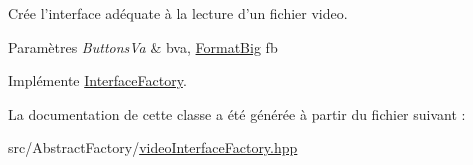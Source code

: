 Crée l'interface adéquate à la lecture d'un fichier video. 


\begin{DoxyParams}{Paramètres}
{\em Buttons\+Va} & bva, \hyperlink{classFormatBig}{Format\+Big} fb \\
\hline
\end{DoxyParams}


Implémente \hyperlink{classInterfaceFactory}{Interface\+Factory}.



La documentation de cette classe a été générée à partir du fichier suivant \+:\begin{DoxyCompactItemize}
\item 
src/\+Abstract\+Factory/\hyperlink{videoInterfaceFactory_8hpp}{video\+Interface\+Factory.\+hpp}\end{DoxyCompactItemize}
